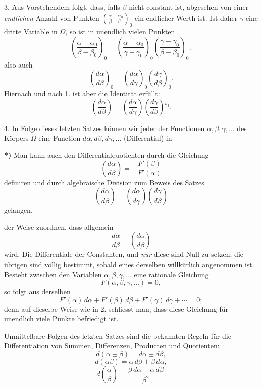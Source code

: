 \documentclass{article}
\begin{document}
3. Aus Vorstehendem folgt, dass, falls $\beta$ nicht constant ist, abgesehen von einer \emph{endlichen} Anzahl von Punkten $\left(\frac{\alpha-\alpha_{0}}{\beta-\beta_{0}}\right)_{0}$ ein endlicher Werth ist. Ist daher $\gamma$ eine dritte Variable in $\Omega$, so ist in unendlich vielen Punkten
\[ \left(\frac{\alpha-\alpha_{0}}{\beta-\beta_{0}}\right)_{0} = \left(\frac{\alpha-\alpha_{0}}{\gamma-\gamma_{0}}\right)_{0}\left(\frac{\gamma-\gamma_{0}}{\beta-\beta_{0}}\right)_{0}, \]
also auch
\[ \left(\frac{d\alpha}{d\beta}\right)_{0} = \left(\frac{d\alpha}{d\gamma}\right)_{0}\left(\frac{d\gamma}{d\beta}\right)_{0}. \]
Hiernach und nach 1. ist aber die Identität erfüllt:
\[ \left(\frac{d\alpha}{d\beta}\right) = \left(\frac{d\alpha}{d\gamma}\right)\left(\frac{d\gamma}{d\beta}\right){}^{*)}. \tag{2.} \]

4. In Folge dieses letzten Satzes können wir jeder der Functionen $\alpha, \beta, \gamma, \ldots$ des Körpers $\Omega$ eine Function $d\alpha, d\beta, d\gamma, \ldots$ (Differential) in

\textbf{*)} Man kann auch den Differentialquotienten durch die Gleichung
\[ \left(\frac{d\alpha}{d\beta}\right) = -\frac{F'(\beta)}{F'(\alpha)} \]
definiren und durch algebraische Division zum Beweis des Satzes
\[ \left(\frac{d\alpha}{d\beta}\right) = \left(\frac{d\alpha}{d\gamma}\right)\left(\frac{d\gamma}{d\beta}\right) \]
gelangen.

der Weise zuordnen, dass allgemein
\[ \frac{d\alpha}{d\beta} = \left(\frac{d\alpha}{d\beta}\right) \]
wird. Die Differentiale der Constanten, und \emph{nur} diese sind Null zu setzen; die übrigen sind völlig bestimmt, sobald eines derselben willkürlich angenommen ist. Besteht zwischen den Variablen $\alpha, \beta, \gamma, \ldots$ eine rationale Gleichung
\[ F(\alpha, \beta, \gamma, \ldots) = 0, \]
so folgt aus derselben
\[ F'(\alpha)\,d\alpha + F'(\beta)\,d\beta + F'(\gamma)\,d\gamma + \cdots = 0; \tag{3.} \]
denn auf dieselbe Weise wie in 2. schliesst man, dass diese Gleichung für unendlich viele Punkte befriedigt ist.

Unmittelbare Folgen des letzten Satzes sind die bekannten Regeln für die Differentiation von Summen, Differenzen, Producten und Quotienten:
\[ d(\alpha \pm \beta) = d\alpha \pm d\beta, \tag{4.} \]
\[ d(\alpha\beta) = \alpha\,d\beta + \beta\,d\alpha, \tag{5.} \]
\[ d\left(\frac{\alpha}{\beta}\right) = \frac{\beta\,d\alpha - \alpha\,d\beta}{\beta^{2}}. \tag{6.} \]
\end{document}
